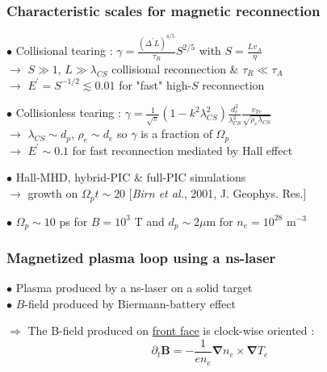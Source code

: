 \documentclass{beamer}
\begin{document}
\begin{frame}
\frametitle{Characteristic scales for magnetic reconnection}

    $\bullet$ Collisional tearing : $\displaystyle \gamma = \frac{(\Delta^{\prime} L)^{4/5}}{\tau_R} S^{2/5}$ with $S = \frac{L v_A}{\eta}$ \\

$\to$ $S \gg 1$, $L \gg \lambda_{CS}$ collisional reconnection \& $\tau_R \ll \tau_A$ \\
    $\to$ $E^{\prime}  = S^{-1/2} \lesssim 0.01$ for "fast" high-$S$ reconnection \\

\bigskip

$\bullet$ Collisionless tearing : $\displaystyle \gamma = \frac{1}{\sqrt{\pi}} (1 - k^2\lambda_{CS}^2) \frac{d_e^2}{\lambda_{CS}^2} \frac{v_{Te}}{\sqrt{\rho_e \lambda_{CS}}} $ \\

$\to$ $\lambda_{CS} \sim d_p$, $\rho_e \sim d_e$ so $\gamma$ is a fraction of $\Omega_p$ \\
$\to$ $E^{\prime} \sim 0.1$ for fast reconnection mediated by Hall effect \\

\bigskip

$\bullet$ Hall-MHD, hybrid-PIC \& full-PIC simulations \\
$\to$ growth on $\Omega_p t \sim 20$ [\textit{Birn et al.}, 2001, J. Geophys. Res.] \\

\bigskip

$\bullet$ $\Omega_p \sim 10$ ps for $B = 10^3$ T and $d_p \sim 2 \mu$m for $n_e = 10^{28}$ m$^{-3}$ \\

\end{frame}



\begin{frame}
\frametitle{Magnetized plasma loop using a ns-laser}

$\bullet$ Plasma produced by a ns-laser on a solid target \\
$\bullet$ $B$-field produced by Biermann-battery effect

\begin{center}

\end{center}

$\Rightarrow$ The B-field produced on \underline{front face} is clock-wise oriented :
$$
\partial_t \mathbf B = - \frac{1}{en_e} \boldsymbol{\nabla} n_e \times \boldsymbol{\nabla} T_e
$$

\end{frame}
\end{document}
